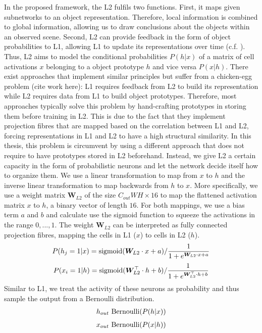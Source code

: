 In the proposed framework, the L2 fulfils two functions. First, it maps given subnetworks to an object representation. Therefore, local information is combined to global information, allowing us to draw conclusions about the objects within an observed scene. Second, L2 can provide feedback in the form of object probabilities to L1, allowing L1 to update its representations over time (c.f. ).
Thus, L2 aims to model the conditional probabilities $P(h|x)$ of a matrix of cell activations $x$ belonging to a object prototype $h$ and vice versa $P(x|h)$.
There exist approaches that implement similar principles but suffer from a chicken-egg problem (cite work here): L1 requires feedback from L2 to build its representation while L2 requires data from L1 to build object prototypes. Therefore, most approaches typically solve this problem by hand-crafting prototypes in storing them before training in L2. This is due to the fact that they implement projection fibres that are mapped based on the correlation between L1 and L2, forcing representations in L1 and L2 to have a high structural similarity.
In this thesis, this problem is circumvent by using a different approach that does not require to have prototypes stored in L2 beforehand. Instead, we give L2 a certain capacity in the form of probabilistic neurons and let the network decide itself how to organize them. 
We use a linear transformation to map from $x$ to $h$ and the inverse linear transformation to map backwards from $h$ to $x$.
More specifically, we use a weight matrix $\boldsymbol{W}_{L2}$ of the size $C_{out}WH \times 16$ to map the flattened activation matrix $x$ to $h$, a binary vector of length $16$. For both mappings, we use a bias term $a$ and $b$ and calculate use the sigmoid function to squeeze the activations in the range $0, ..., 1$. 
The weight $\boldsymbol{W}_{L2}$ can be interpreted as fully connected projection fibres, mapping the cells in L1 ($x$) to cells in L2 ($h$).
\begin{align}\eqlbl{l2_1}
	P(h_j=1 | x) = \text{sigmoid}(\boldsymbol{W}_{L2} \cdot x + a) / \frac{1}{1 + e^{\boldsymbol{W}_{L2} \cdot x + a}}
\end{align}
\begin{align}\eqlbl{l2_2}
	P(x_i=1 | h) = \text{sigmoid}(\boldsymbol{W}_{L2}^\top \cdot h + b) / \frac{1}{1 + e^{\boldsymbol{W}_{L2}^\top \cdot h + b}}
\end{align}
Similar to L1, we treat the activity of these neurons as probability and thus sample the output from a Bernoulli distribution.
\begin{align}\eqlbl{l2_3}
	h_{out} ~ \text{Bernoulli}(P(h | x) )
\end{align}
\begin{align}\eqlbl{l2_4}
	x_{out} ~ \text{Bernoulli}(P(x | h))
\end{align}

